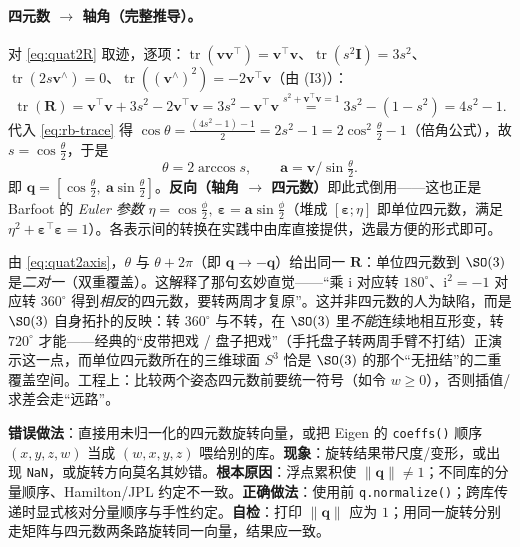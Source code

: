 \paragraph{四元数 $\to$ 轴角（完整推导）。}对 \cref{eq:quat2R} 取迹，逐项：$\operatorname{tr}(\mathbf{v}\mathbf{v}^\top)=\mathbf{v}^\top\mathbf{v}$、$\operatorname{tr}(s^2\mathbf{I})=3s^2$、$\operatorname{tr}(2s\mathbf{v}^\wedge)=0$、$\operatorname{tr}((\mathbf{v}^\wedge)^2)=-2\mathbf{v}^\top\mathbf{v}$（由 (I3)）：
\begin{equation}
  \operatorname{tr}(\mathbf{R})=\mathbf{v}^\top\mathbf{v}+3s^2-2\mathbf{v}^\top\mathbf{v}=3s^2-\mathbf{v}^\top\mathbf{v}\overset{s^2+\mathbf{v}^\top\mathbf{v}=1}{=}3s^2-(1-s^2)=4s^2-1.
\end{equation}
代入 \cref{eq:rb-trace} 得 $\cos\theta=\frac{(4s^2-1)-1}{2}=2s^2-1=2\cos^2\tfrac{\theta}{2}-1$（倍角公式），故 $s=\cos\tfrac{\theta}{2}$，于是
\begin{equation}
  \theta=2\arccos s,\qquad \mathbf{a}=\mathbf{v}\big/\sin\tfrac{\theta}{2}.
  \label{eq:quat2axis}
\end{equation}
即 $\mathbf{q}=[\cos\tfrac{\theta}{2},\ \mathbf{a}\sin\tfrac{\theta}{2}]$。\textbf{反向（轴角 $\to$ 四元数）}即此式倒用——这也正是 Barfoot 的 \emph{Euler 参数} $\eta=\cos\tfrac{\phi}{2},\ \boldsymbol{\varepsilon}=\mathbf{a}\sin\tfrac{\phi}{2}$（堆成 $[\boldsymbol{\varepsilon};\eta]$ 即单位四元数，满足 $\eta^2+\boldsymbol{\varepsilon}^\top\boldsymbol{\varepsilon}=1$）\cite{barfoot2024state}。各表示间的转换在实践中由库直接提供，选最方便的形式即可。

\begin{insight}
由 \cref{eq:quat2axis}，$\theta$ 与 $\theta+2\pi$（即 $\mathbf{q}\to-\mathbf{q}$）给出同一 $\mathbf{R}$：单位四元数到 $\SO(3)$ 是\emph{二对一}（双重覆盖）。这解释了那句玄妙直觉——“乘 $\mathrm{i}$ 对应转 $180^\circ$、$\mathrm{i}^2=-1$ 对应转 $360^\circ$ 得到\emph{相反}的四元数，要转两周才复原”\cite{gaoxiang2019slam14}。这并非四元数的人为缺陷，而是 $\SO(3)$ 自身拓扑的反映：转 $360^\circ$ 与不转，在 $\SO(3)$ 里\emph{不能}连续地相互形变，转 $720^\circ$ 才能——经典的“皮带把戏 / 盘子把戏”（手托盘子转两周手臂不打结）正演示这一点，而单位四元数所在的三维球面 $S^3$ 恰是 $\SO(3)$ 的那个“无扭结”的二重覆盖空间\cite{hanson2006visualizing}。工程上：比较两个姿态四元数前要统一符号（如令 $w\ge0$），否则插值/求差会走“远路”。
\end{insight}

\begin{pitfall}
\textbf{错误做法}：直接用未归一化的四元数旋转向量，或把 Eigen 的 \texttt{coeffs()} 顺序 $(x,y,z,w)$ 当成 $(w,x,y,z)$ 喂给别的库。\textbf{现象}：旋转结果带尺度/变形，或出现 \texttt{NaN}，或旋转方向莫名其妙错。\textbf{根本原因}：浮点累积使 $\|\mathbf{q}\|\neq1$；不同库的分量顺序、Hamilton/JPL 约定不一致。\textbf{正确做法}：使用前 \texttt{q.\allowbreak normalize()}；跨库传递时显式核对分量顺序与手性约定。\textbf{自检}：打印 $\|\mathbf{q}\|$ 应为 $1$；用同一旋转分别走矩阵与四元数两条路旋转同一向量，结果应一致。
\end{pitfall}

